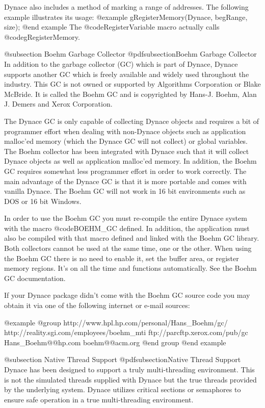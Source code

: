 Dynace also includes a method of marking a range of addresses.  The following
example illustrates its usage:
@example
        gRegisterMemory(Dynace, begRange, size);
@end example
The @code{RegisterVariable} macro actually calls @code{gRegisterMemory}.




@subsection Boehm Garbage Collector
@pdfsubsection{Boehm Garbage Collector}
In addition to the garbage collector (GC) which is part of Dynace,
Dynace supports another GC which is freely available and widely used
throughout the industry.  This GC is not owned or supported by
Algorithms Corporation or Blake McBride.  It is called the Boehm GC and is
copyrighted by Hans-J. Boehm, Alan J. Demers and Xerox Corporation.

The Dynace GC is only capable of collecting Dynace objects and requires
a bit of programmer effort when dealing with non-Dynace objects such as
application malloc'ed memory (which the Dynace GC will not collect) or
global variables.  The Boehm collector has been integrated with Dynace
such that it will collect Dynace objects as well as application
malloc'ed memory.  In addition, the Boehm GC requires somewhat less
programmer effort in order to work correctly.  The main advantage of the
Dynace GC is that it is more portable and comes with vanilla Dynace.
The Boehm GC will not work in 16 bit environments such as DOS or 16 bit
Windows.

In order to use the Boehm GC you must re-compile the entire Dynace
system with the macro @code{BOEHM_GC} defined.  In addition, the
application must also be compiled with that macro defined and linked
with the Boehm GC library.  Both collectors cannot be used at the same
time, one or the other.  When using the Boehm GC there is no need to
enable it, set the buffer area, or register memory regions.  It's on all
the time and functions automatically.  See the Boehm GC documentation.

If your Dynace package didn't come with the Boehm GC source code you
may obtain it via one of the following internet or e-mail sources:

@example
@group
http://www.hpl.hp.com/personal/Hans_Boehm/gc/
http://reality.sgi.com/employees/boehm_mti
ftp://parcftp.xerox.com/pub/gc
Hans_Boehm@@hp.com
boehm@@acm.org
@end group
@end example



@subsection Native Thread Support
@pdfsubsection{Native Thread Support}
Dynace has been designed to support a truly multi-threading
environment.  This is not the simulated threads supplied with Dynace
but the true threads provided by the underlying system.  Dynace
utilizes critical sections or semaphores to ensure safe operation
in a true multi-threading environment.

